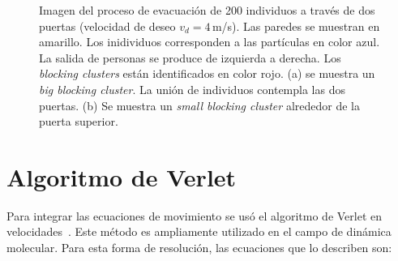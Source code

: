 \begin{figure}[H]
    \centering
    \hfill
    \caption[width=5cm]{Imagen del proceso de evacuación de  200 individuos a través de dos puertas (velocidad de deseo $v_d=4\,$m/s). Las paredes se muestran en amarillo. Los inidividuos corresponden a las partículas en color azul. La salida de personas se produce de izquierda a derecha. Los \textit{blocking clusters} están identificados en color rojo. (a) se muestra un \textit{big blocking cluster}. La unión de individuos contempla las dos puertas. (b)  Se muestra un \textit{small blocking cluster} alrededor de la puerta superior.}
    \label{bc}
\end{figure}


\section{\label{verlet} Algoritmo de Verlet}

Para integrar las ecuaciones de movimiento se usó el algoritmo de Verlet en velocidades~\cite{haile}. Este método es ampliamente utilizado en el campo de dinámica molecular. Para esta forma de resolución, las ecuaciones que lo describen son:

